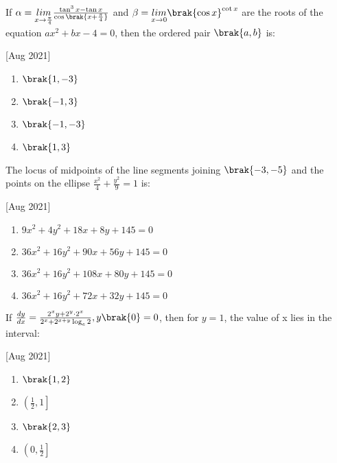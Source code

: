     \item If $\alpha=\underset{x\to\frac{\pi}{4}}{lim}\frac{\tan^3 x-\tan x}{\cos\brak{x+\frac{\pi}{4}}}$ and $\beta=\underset{x\to 0}{lim}\brak{\cos x}^{\cot x}$ are the roots of the equation $ax^2+bx-4=0$, then the ordered pair $\brak{a,b}$ is:
    
    \hfill[Aug 2021]

        \begin{multicols}{4}
            \begin{enumerate}
                \item $\brak{1,-3}$
                \item $\brak{-1,3}$
                \item $\brak{-1,-3}$
                \item $\brak{1,3}$
            \end{enumerate}
        \end{multicols}

    \item The locus of midpoints of the line segments joining $\brak{-3,-5}$ and the points on the ellipse $\frac{x^2}{4}+\frac{y^2}{9}=1$ is:
    
    \hfill[Aug 2021]

        \begin{multicols}{2}
            \begin{enumerate}
                \item $9x^2+4y^2+18x+8y+145=0$
                \item $36x^2+16y^2+90x+56y+145=0$
                \item $36x^2+16y^2+108x+80y+145=0$
                \item $36x^2+16y^2+72x+32y+145=0$
            \end{enumerate}
        \end{multicols}

    \item If $\frac{dy}{dx}=\frac{2^xy+2^y\cdot 2^x}{2^x+2^{x+y}\log_e2}, y\brak{0}=0$, then for $y=1$, the value of x lies in the interval:
    
    \hfill[Aug 2021]

        \begin{multicols}{4}
            \begin{enumerate}
                \item $\brak{1,2}$
                \item $\left( \frac{1}{2},1\right]$
                \item  $\brak{2,3}$
                \item $\left( 0,\frac{1}{2}\right]$
            \end{enumerate}
        \end{multicols}
        
